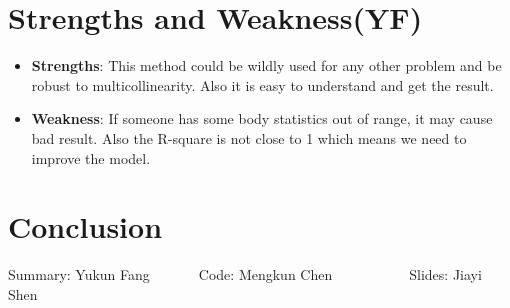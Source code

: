 \documentclass[12pt]{article}
\begin{document}
\section{\sffamily Strengths and Weakness(YF)}
\begin{itemize}
    \item \textbf{Strengths}: This method could be wildly used for any other problem and be robust to multicollinearity. Also it is easy to understand and 
    get the result.
    \item \textbf{Weakness}: If someone has some body statistics out of
    range, it may cause bad result. Also the R-square is not close to 1 which means 
    we need to improve the model.
\end{itemize}
\section{\sffamily Conclusion}
    \centerline{Summary: Yukun Fang~~~~~~~Code: Mengkun Chen~~~~~~~~~~~Slides: Jiayi Shen}
\end{document}
